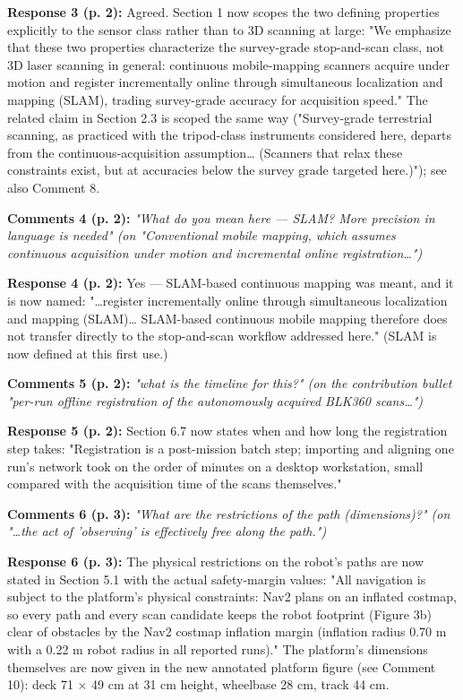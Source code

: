 \documentclass[11pt]{article}
\begin{document}
\textbf{Response 3 (p. 2):} Agreed. Section 1 now scopes the two defining properties explicitly to the sensor class rather than to 3D scanning at large: "We emphasize that these two properties characterize the survey-grade stop-and-scan class, not 3D laser scanning in general: continuous mobile-mapping scanners acquire under motion and register incrementally online through simultaneous localization and mapping (SLAM), trading survey-grade accuracy for acquisition speed." The related claim in Section 2.3 is scoped the same way ("Survey-grade terrestrial scanning, as practiced with the tripod-class instruments considered here, departs from the continuous-acquisition assumption… (Scanners that relax these constraints exist, but at accuracies below the survey grade targeted here.)"); see also Comment 8.

\medskip

\textbf{Comments 4 (p. 2):} \emph{"What do you mean here — SLAM? More precision in language is needed" \emph{(on "Conventional mobile mapping, which assumes continuous acquisition under motion and incremental online registration…")}}

\textbf{Response 4 (p. 2):} Yes — SLAM-based continuous mapping was meant, and it is now named: "…register incrementally online through simultaneous localization and mapping (SLAM)… SLAM-based continuous mobile mapping therefore does not transfer directly to the stop-and-scan workflow addressed here." (SLAM is now defined at this first use.)

\medskip

\textbf{Comments 5 (p. 2):} \emph{"what is the timeline for this?" \emph{(on the contribution bullet "per-run offline registration of the autonomously acquired BLK360 scans…")}}

\textbf{Response 5 (p. 2):} Section 6.7 now states when and how long the registration step takes: "Registration is a post-mission batch step; importing and aligning one run's network took on the order of minutes on a desktop workstation, small compared with the acquisition time of the scans themselves."

\medskip

\textbf{Comments 6 (p. 3):} \emph{"What are the restrictions of the path (dimensions)?" \emph{(on "…the act of 'observing' is effectively free along the path.")}}

\textbf{Response 6 (p. 3):} The physical restrictions on the robot's paths are now stated in Section 5.1 with the actual safety-margin values: "All navigation is subject to the platform's physical constraints: Nav2 plans on an inflated costmap, so every path and every scan candidate keeps the robot footprint (Figure 3b) clear of obstacles by the Nav2 costmap inflation margin (inflation radius 0.70 m with a 0.22 m robot radius in all reported runs)." The platform's dimensions themselves are now given in the new annotated platform figure (see Comment 10): deck 71 × 49 cm at 31 cm height, wheelbase 28 cm, track 44 cm.
\end{document}
